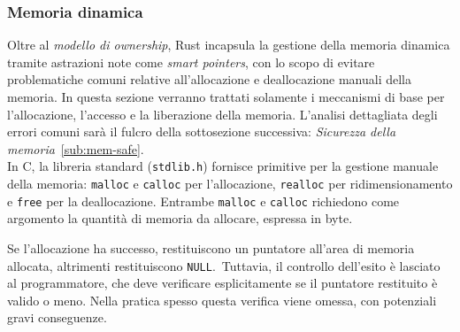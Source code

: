 \subsubsection{Memoria dinamica}
Oltre al \textit{modello di ownership}, Rust incapsula la gestione della memoria dinamica tramite astrazioni note come \textit{smart pointers}, con lo scopo
di evitare problematiche comuni relative all'allocazione e deallocazione manuali della memoria. In questa sezione 
verranno trattati solamente i meccanismi di base
per l'allocazione, 
l'accesso e la liberazione della memoria. L'analisi dettagliata degli errori comuni sarà il fulcro della sottosezione successiva: \textit{Sicurezza della memoria}~\ref{sub:mem-safe}. \hfill
\vspace{10pt}\\
\noindent In C, la libreria standard (\texttt{stdlib.h}) fornisce primitive per la gestione manuale della memoria: \texttt{malloc} e \texttt{calloc} per l'allocazione, \texttt{realloc} per ridimensionamento e \texttt{free} per la deallocazione.
Entrambe \texttt{malloc} e \texttt{calloc} richiedono come argomento la quantità di memoria da allocare, espressa in byte. 

Se l'allocazione ha successo, restituiscono un puntatore all'area di memoria allocata, altrimenti restituiscono \texttt{NULL}.\ 
Tuttavia, il controllo dell'esito è lasciato al programmatore, che deve verificare esplicitamente se il puntatore restituito è valido o meno. 
Nella pratica spesso questa verifica viene omessa, con potenziali gravi conseguenze.

